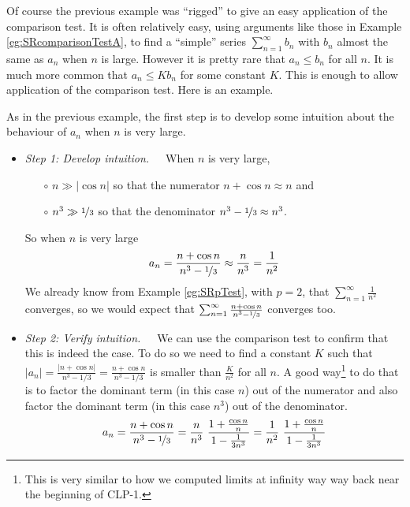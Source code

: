 Of course the previous example was ``rigged'' to give an easy application
of the comparison test. It is often relatively easy, using arguments like
those in Example \ref{eg:SRcomparisonTestA}, to find a
``simple'' series $\sum_{n=1}^\infty b_n$ with $b_n$ almost the same
as $a_n$ when $n$ is large. However it is pretty rare that $a_n\le b_n$
for all $n$. It is much more common that $a_n\le K b_n$
for some constant $K$. This is enough to allow application of the
comparison test. Here is an example.

\begin{eg}[$\sum_{n=1}^\infty\frac{n+\cos n}{n^3-1/3}$]
                                   \label{eg:SRcomparisonTestB}
As in the previous example, the first step is to develop some
intuition about the behaviour of $a_n$ when $n$ is very large.
\begin{itemize}
\item \emph{Step 1: Develop intuition.}\ \ \
When $n$ is very large,
\begin{itemize}
\item[$\circ$] $n\gg |\cos n|$ so that  the numerator $n+\cos n\approx n$  and
\item[$\circ$] $n^3 \gg \nicefrac{1}{3}$ so that the denominator
$n^3-\nicefrac{1}{3}\approx n^3$.
\end{itemize}
So when $n$ is very large
\begin{equation*}
a_n=\frac{n+\cos n}{n^3-\nicefrac{1}{3}}\approx\frac{n}{n^3}=\frac{1}{n^2}
\end{equation*}
We already know from Example \ref{eg:SRpTest}, with $p=2$, that
$\sum_{n=1}^\infty\frac{1}{n^2}$ converges, so we would expect that
$\sum_{n=1}^\infty\frac{n+\cos n}{n^3-\nicefrac{1}{3}}$ converges too.
\item \emph{Step 2: Verify intuition.}\ \ \
We can use the comparison test to confirm that this is indeed the case.
To do so we need to find a constant $K$ such that  $|a_n|=
\frac{|n+\cos n|}{n^3-1/3}=\frac{n+\cos n}{n^3-1/3}$
is smaller than $\frac{K}{n^2}$ for all $n$. A good way\footnote{This is very similar to how we computed limits at infinity way way back near the
beginning of CLP-1.} to do
that is to factor the dominant term (in this case $n$) out of the
numerator and also factor the dominant term (in this case $n^3$)
out of the denominator.
\begin{equation*}
a_n=\frac{n+\cos n}{n^3-\nicefrac{1}{3}}
=\frac{n}{n^3}\
   \frac{1+\frac{\cos n}{n}}{1-\frac{1}{3n^3}}
=\frac{1}{n^2}\
   \frac{1+\frac{\cos n}{n}}{1-\frac{1}{3n^3}}

\end{equation*}
\end{itemize}
\end{eg}
